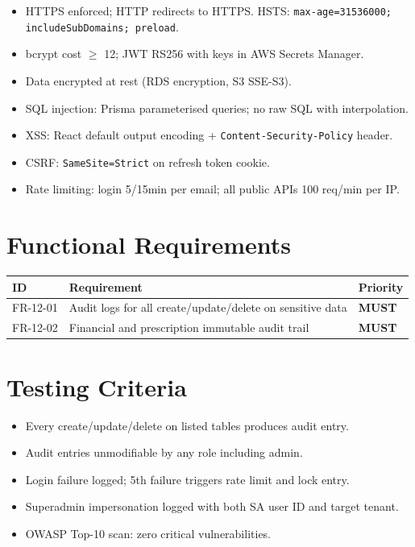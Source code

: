 \documentclass[12pt,a4paper]{report}
\newcommand{\must}{\colorbox{red!15}{\color{errorred}\textbf{\small MUST}}}
\newcommand{\testcheck}{\textcolor{successgreen}{\ding{51}}}
\begin{document}
\begin{itemize}
  \item HTTPS enforced; HTTP redirects to HTTPS. HSTS: \texttt{max-age=31536000; includeSubDomains; preload}.
  \item bcrypt cost $\geq$ 12; JWT RS256 with keys in AWS Secrets Manager.
  \item Data encrypted at rest (RDS encryption, S3 SSE-S3).
  \item SQL injection: Prisma parameterised queries; no raw SQL with interpolation.
  \item XSS: React default output encoding + \texttt{Content-Security-Policy} header.
  \item CSRF: \texttt{SameSite=Strict} on refresh token cookie.
  \item Rate limiting: login 5/15min per email; all public APIs 100 req/min per IP.
\end{itemize}

\section{Functional Requirements}

\begin{longtable}{L{2.5cm} L{9cm} C{2cm}}
\toprule
\textbf{ID} & \textbf{Requirement} & \textbf{Priority} \\\midrule\endhead\bottomrule\endfoot
FR-12-01 & Audit logs for all create/update/delete on sensitive data & \must \\
FR-12-02 & Financial and prescription immutable audit trail & \must \\
\end{longtable}

\section{Testing Criteria}

\begin{itemize}
  \item[\testcheck] Every create/update/delete on listed tables produces audit entry.
  \item[\testcheck] Audit entries unmodifiable by any role including admin.
  \item[\testcheck] Login failure logged; 5th failure triggers rate limit and lock entry.
  \item[\testcheck] Superadmin impersonation logged with both SA user ID and target tenant.
  \item[\testcheck] OWASP Top-10 scan: zero critical vulnerabilities.
\end{itemize}
\end{document}
